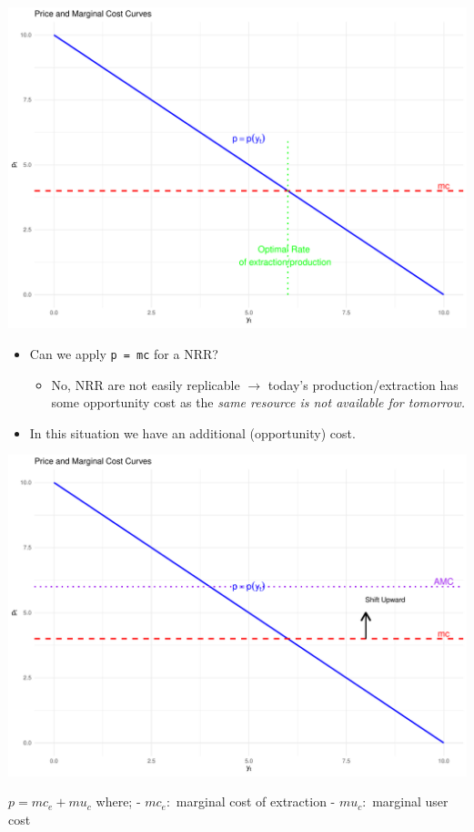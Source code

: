 \documentclass[
  ignorenonframetext,
]{beamer}
\providecommand{\tightlist}{%
  \setlength{\itemsep}{0pt}\setlength{\parskip}{0pt}}\usepackage{longtable,booktabs,array}
\begin{document}
\begin{frame}
\includegraphics{intro_files/figure-beamer/unnamed-chunk-4-1.pdf}
\end{frame}

\begin{frame}[fragile]
\begin{itemize}
\tightlist
\item
  Can we apply \texttt{p\ =\ mc} for a NRR?

  \begin{itemize}
  \tightlist
  \item
    No, NRR are not easily replicable \(\rightarrow\) today's
    production/extraction has some opportunity cost as the \emph{same
    resource is not available for tomorrow.}
  \end{itemize}
\end{itemize}
\end{frame}

\begin{frame}
\begin{itemize}
\tightlist
\item
  In this situation we have an additional (opportunity) cost.
\end{itemize}

\includegraphics{intro_files/figure-beamer/unnamed-chunk-5-1.pdf}

\(p = mc_e + mu_c\) where; - \(mc_e:\) marginal cost of extraction -
\(mu_c:\) marginal user cost
\end{frame}
\end{document}
